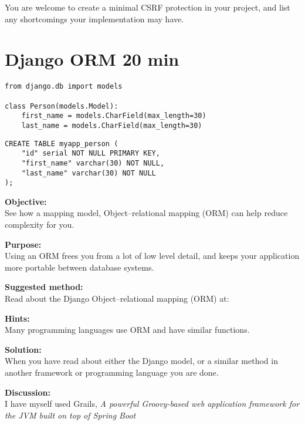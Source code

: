 \documentclass[a4paper,11pt,notitlepage]{report}
\begin{document}
You are welcome to create a minimal CSRF protection in your project, and list any shortcomings your implementation may have.


\chapter{Django ORM 20 min}
\label{ex:django-orm}

\begin{verbatim}
from django.db import models

class Person(models.Model):
    first_name = models.CharField(max_length=30)
    last_name = models.CharField(max_length=30)
\end{verbatim}

\begin{verbatim}
CREATE TABLE myapp_person (
    "id" serial NOT NULL PRIMARY KEY,
    "first_name" varchar(30) NOT NULL,
    "last_name" varchar(30) NOT NULL
);
\end{verbatim}

{\bf Objective:}\\
See how a mapping model, Object–relational mapping (ORM) can help reduce complexity for you.


{\bf Purpose:}\\
Using an ORM frees you from a lot of low level detail, and keeps your application more portable between database systems.


{\bf Suggested method:}\\
Read about the Django  Object–relational mapping (ORM) at:

\begin{list2}
\item {}
\item {}
\end{list2}

{\bf Hints:}\\
Many programming languages use ORM and have similar functions.

{\bf Solution:}\\
When you have read about either the Django model, or a similar method in another framework or programming language you are done.

{\bf Discussion:}\\
I have myself used Grails,
\emph{A powerful Groovy-based web application framework for the JVM built on top of Spring Boot}
\end{document}
